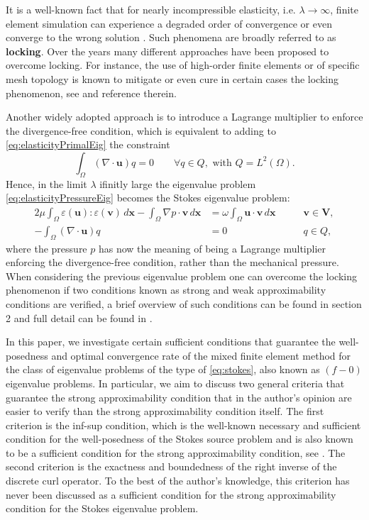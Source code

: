 \documentclass[USenglish]{article}
\theoremstyle{dgthm}
\theoremstyle{dgdef}
\let\vec\bm
\begin{document}
It is a well-known fact that for nearly incompressible elasticity, i.e. $\lambda\to \infty$, finite element simulation can experience a degraded order of convergence or even converge to the wrong solution \cite{AinsworthParker}. Such phenomena are broadly referred to as \textbf{locking}. Over the years many different approaches have been proposed to overcome locking.
For instance, the use of high-order finite elements or of specific mesh topology is known to mitigate or even cure in certain cases the locking phenomenon, see \cite{AinsworthParker, BabuskaSuri, BBF} and reference therein.

Another widely adopted approach is to introduce a Lagrange multiplier to enforce the divergence-free condition, which is equivalent to adding to \eqref{eq:elasticityPrimalEig} the constraint
\begin{equation}
  \label{eq:lagrangeMultiplier}
  \int_\Omega (\nabla\cdot \vec{u})q = 0 \qquad \forall  q\in Q, \text{ with } Q=L^2(\Omega).
\end{equation}
Hence, in the limit $\lambda$ ifinitly large the eigenvalue problem \eqref{eq:elasticityPressureEig} becomes the Stokes eigenvalue problem:
\begin{equation}
  \label{eq:stokes}
  \begin{aligned}
    2\mu \int_\Omega \varepsilon(\vec{u}):\varepsilon(\vec{v})\, d\vec{x}-\int_\Omega \nabla p \cdot \vec{v}\, d\vec{x} &= \omega \int_\Omega \vec{u}\cdot \vec{v}\, d\vec{x} \qquad &\vec{v}\in \vec{V},\\
    -\int_\Omega (\nabla\cdot \vec{u})q &= 0 \qquad&q \in Q,
  \end{aligned}
\end{equation}
where the pressure $p$ has now the meaning of being a Lagrange multiplier enforcing the divergence-free condition, rather than the mechanical pressure.
When considering the previous eigenvalue problem one can overcome the locking phenomenon if two conditions known as strong and weak approximability conditions are verified, a brief overview of such conditions can be found in section 2 and full detail can be found in \cite{BBG, BBF}.

In this paper, we investigate certain sufficient conditions that guarantee the well-posedness and optimal convergence rate of the mixed finite element method for the class of eigenvalue problems of the type of \eqref{eq:stokes}, also known as $(f\!-\!0)$ eigenvalue problems.
In particular, we aim to discuss two general criteria that guarantee the strong approximability condition that in the author's opinion are easier to verify than the strong approximability condition itself.
The first criterion is the inf-sup condition, which is the well-known necessary and sufficient condition for the well-posedness of the Stokes source problem and is also known to be a sufficient condition for the strong approximability condition, see \cite{BBF,BBG}.
The second criterion is the exactness and boundedness of the right inverse of the discrete curl operator. To the best of the author's knowledge, this criterion has never been discussed as a sufficient condition for the strong approximability condition for the Stokes eigenvalue problem.
\end{document}
